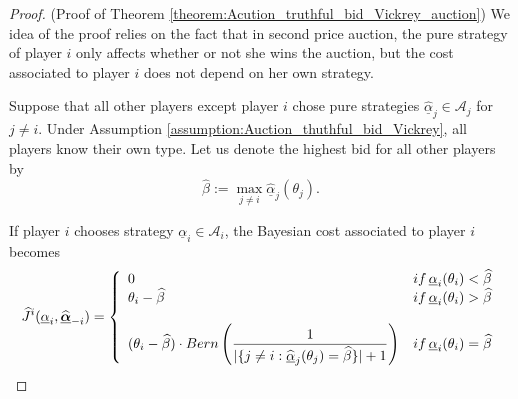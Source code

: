 \begin{proof}(Proof of Theorem \ref{theorem:Acution_truthful_bid_Vickrey_auction})
	We idea of the proof relies on the fact that in second price auction, the pure strategy of player $i$ only affects whether or not she wins the auction, but the cost associated to player $i$ does not depend on her own strategy.
	
	Suppose that all other players except player $i$ chose pure strategies $\hat{\underline{\alpha}}_j \in \mathcal{A}_j$ for $j \neq i$. Under Assumption \ref{assumption:Auction_thuthful_bid_Vickrey}, all players know their own type. Let us denote the highest bid for all other players by
	$$
		\hat{\beta} := \max_{j \neq i} \hat{\underline{\alpha}}_j (\theta_j) .
	$$	
	
	If player $i$ chooses strategy $\underline{\alpha}_i \in \mathcal{A}_i$, the Bayesian cost associated to player $i$ becomes
	$$
		\widehat{J}^i(\underline{\alpha}_i, \widehat{\underline{\boldsymbol{\alpha}}}_{-i} ) = \left\{
		\begin{array}{lc}
			0 & if \,  \underline{\alpha}_i(\theta_i) < \widehat{\beta} \\
			\theta_i - \widehat{\beta} & if \, \underline{\alpha}_i(\theta_i) > \widehat{\beta} \\
			\\
			\displaystyle ( \theta_i- \widehat{\beta} )\cdot Bern\left( \frac{1}{| \{j \neq i : \widehat{\underline{\alpha}}_j(\theta_j) = \widehat{\beta}\} | + 1} \right) & if\, \underline{\alpha}_i(\theta_i) = \widehat{\beta} \\
		\end{array}
		\right.
	$$
	

\end{proof}
